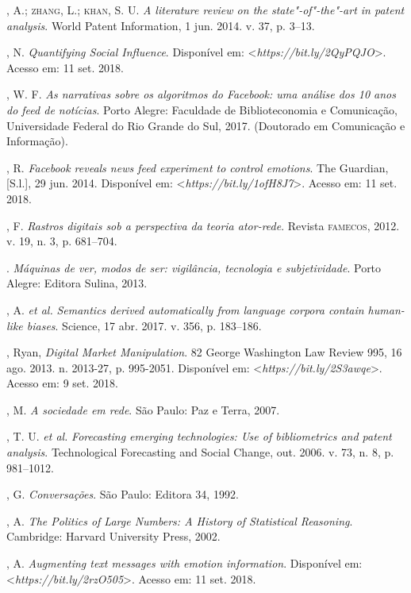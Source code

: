 \begin{bibliohedra}
, A.; \textsc{zhang}, L.; \textsc{khan}, S. U. \emph{A literature review on the
state"-of"-the"-art in patent analysis}. World Patent Information, 1 jun.
2014. v. 37, p. 3--13.

, N. \emph{Quantifying Social Influence}. Disponível em:
\textless{}\emph{https://bit.ly/2QyPQJO}\textgreater{}. Acesso em: 11 set. 2018.

, W. F. \emph{As narrativas sobre os algoritmos do Facebook: uma
análise dos 10 anos do feed de notícias}. Porto Alegre: Faculdade de
Biblioteconomia e Comunicação, Universidade Federal do Rio Grande do
Sul, 2017. (Doutorado em Comunicação e Informação).

, R. \emph{Facebook reveals news feed experiment to control
emotions}. The Guardian, [S.l.], 29 jun. 2014. Disponível em:
\textless{}\emph{https://bit.ly/1ofH8J7}\textgreater{}. Acesso em: 11 set. 2018.

, F. \emph{Rastros digitais sob a perspectiva da teoria
ator-rede}. Revista \textsc{famecos}, 2012. v. 19, n. 3, p. 681--704.

\titidem. \emph{Máquinas de ver, modos de ser: vigilância,
tecnologia e subjetividade}. Porto Alegre: Editora Sulina, 2013.

, A. \emph{et al.} \emph{Semantics derived automatically from
language corpora contain human-like biases}. Science, 17 abr. 2017. v.
356, p. 183--186.

, Ryan, \emph{Digital Market Manipulation}. 82 George Washington
Law Review 995, 16 ago. 2013. n. 2013-27, p. 995-2051. Disponível em:
\textless{}\emph{https://bit.ly/2S3awqe}\textgreater{}. Acesso em: 9 set. 2018.

, M. \emph{A sociedade em rede}. São Paulo: Paz e Terra, 2007.

, T. U. \emph{et al.} \emph{Forecasting emerging technologies: Use
of bibliometrics and patent analysis}. Technological Forecasting and
Social Change, out. 2006. v. 73, n. 8, p. 981--1012.

, G. \emph{Conversações}. São Paulo: Editora 34, 1992.

, A. \emph{The Politics of Large Numbers: A History of
Statistical Reasoning}. Cambridge: Harvard University Press, 2002.

, A. \emph{Augmenting text messages with emotion information}.
Disponível em: \textless{}\emph{https://bit.ly/2rzO505}\textgreater{}. Acesso em: 11 set. 2018.


\end{bibliohedra}
